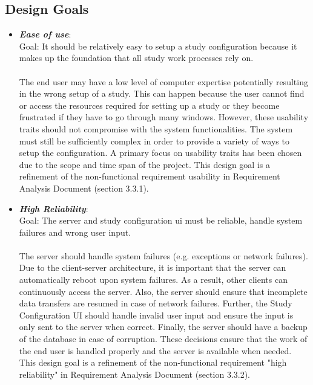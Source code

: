 \subsection{Design Goals}

\begin{itemize}
\item \textit{\bf{Ease of use}}: 
\\
Goal: It should be relatively easy to setup a study configuration because it makes up the foundation that all study work processes rely on. 
\\\\
The end user may have a low level of computer expertise potentially resulting in the wrong setup of a study.  This can happen because the user cannot find or access the resources required for setting up a study or they become frustrated if they have to go through many windows. However, these usability traits should not compromise with the system functionalities. The system must still be sufficiently complex in order to provide a variety of ways to setup the configuration.  A primary focus on usability traits has been chosen due to the scope and time span of the project. This design goal is a refinement of the non-functional requirement  usability in Requirement Analysis Document  (section 3.3.1). 

\item \textit{\bf{High Reliability}}: 
\\
Goal: The server and study configuration ui must be reliable, handle system failures and wrong user input.
\\\\
The server should handle system failures (e.g. exceptions or network failures). Due to the client-server architecture, it is important that the server can automatically reboot upon system failures. As a result, other clients can continuously access the server. Also, the server should ensure that incomplete data transfers are resumed in case of network failures. Further, the Study Configuration UI should handle invalid user input and ensure the input is only sent to the server when correct. Finally, the server should have a backup of the database in case of corruption. These decisions ensure that the work of the end user is handled properly and the server is available when needed. This design goal is a refinement of the non-functional requirement "high reliability" in Requirement Analysis Document (section 3.3.2).  


\end{itemize}
